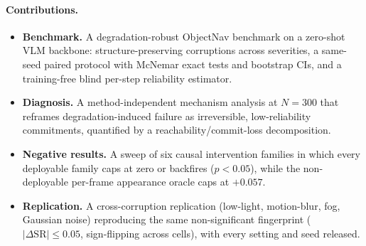 \paragraph{Contributions.}
\begin{itemize}
\item \textbf{Benchmark.} A degradation-robust ObjectNav benchmark on a
  zero-shot VLM backbone: structure-preserving corruptions across
  severities, a same-seed paired protocol with McNemar exact tests and
  bootstrap CIs, and a training-free blind per-step reliability estimator.
\item \textbf{Diagnosis.} A method-independent mechanism analysis at
  $N{=}300$ that reframes degradation-induced failure as irreversible,
  low-reliability commitments, quantified by a reachability/commit-loss
  decomposition.
\item \textbf{Negative results.} A sweep of six causal intervention
  families in which every deployable family caps at zero or backfires
  ($p{<}0.05$), while the non-deployable per-frame appearance oracle caps
  at $+0.057$.
\item \textbf{Replication.} A cross-corruption replication (low-light,
  motion-blur, fog, Gaussian noise) reproducing the same non-significant
  fingerprint ($|\Delta\text{SR}|{\leq}0.05$, sign-flipping across
  cells), with every setting and seed released.
\end{itemize}
